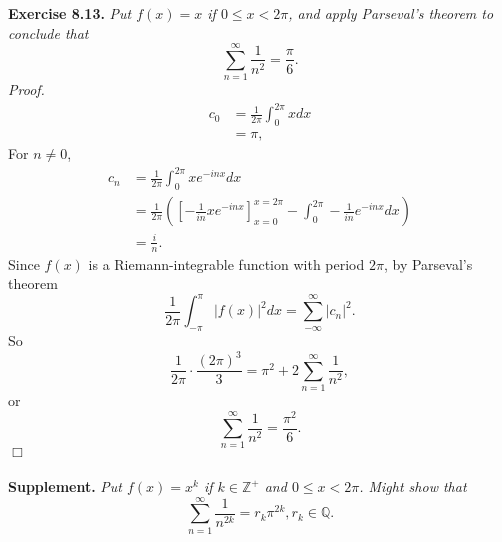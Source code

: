 \documentclass{article}
\begin{document}
\textbf{Exercise 8.13.}
\emph{Put $f(x) = x$ if $0 \leq x < 2 \pi$, and apply Parseval's theorem to conclude that
$$\sum_{n = 1}^{\infty} \frac{1}{n^2} = \frac{\pi}{6}.$$}
\emph{Proof.}
\begin{align*}
c_0
&= \frac{1}{2 \pi} \int_{0}^{2 \pi} x dx \\
&= \pi,
\end{align*}
For $n \neq 0$,
\begin{align*}
c_n
&= \frac{1}{2 \pi} \int_{0}^{2 \pi} x e^{-inx} dx \\
&= \frac{1}{2 \pi} \left(
\left[ - \frac{1}{i n} x e^{-inx} \right]_{x = 0}^{x = 2 \pi}
- \int_{0}^{2 \pi} - \frac{1}{i n} e^{-inx} dx \right) \\
&= \frac{i}{n}.
\end{align*}
Since $f(x)$ is a Riemann-integrable function with period $2 \pi$,
by Parseval's theorem
$$\frac{1}{2 \pi} \int_{-\pi}^\pi |f(x)|^2 dx = \sum_{-\infty}^{\infty} |c_n|^2.$$
So
$$\frac{1}{2 \pi} \cdot \frac{(2 \pi)^3}{3}
= \pi^2 + 2 \sum_{n = 1}^{\infty} \frac{1}{n^2}, $$
or
$$\sum_{n = 1}^{\infty} \frac{1}{n^2}
= \frac{\pi^2}{6}.$$
$\Box$ \\\\

\textbf{Supplement.} \emph{
Put $f(x) = x^k$ if $k \in \mathbb{Z}^+$ and $0 \leq x < 2 \pi$.
Might show that
$$\sum_{n = 1}^{\infty} \frac{1}{n^{2k}} = r_k \pi^{2k}, r_k \in \mathbb{Q}.$$}
\end{document}
